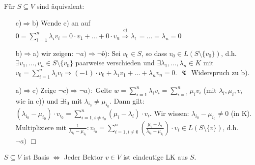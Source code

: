 \begin{lem}
	Für $S\subseteq V$ sind äquivalent:
\end{lem}

\begin{bew}
	\begin{itemize} %
		\item[c)$\Rightarrow$b)] Wende c) an auf $0=\sum\limits_{i=1}^n \lambda_i v_i =0\cdot v_1 +...+0\cdot v_n \stackrel{c)}{\Rightarrow} \lambda_1 =...= \lambda_n =0$
		\item[b)$\Rightarrow$a)] wir zeigen: $\neg a)\Rightarrow \neg b)$: Sei $v_0 \in S$, so dass $v_0 \in L(S\setminus\{v_0\})$, d.h. $\exists v_1,...,v_n \in S\setminus\{v_0\}$ paarweise verschieden und $\exists \lambda_1,...,\lambda_n \in K$ mit $v_0 =\sum\limits_{i=1}^n \lambda_i v_i \Rightarrow (-1)\cdot v_0 +\lambda_1 v_1 +...+ \lambda_n v_n =0$. $\lightning$ Widerspruch zu b).
		\item[a)$\Rightarrow$c)] Zeige $\neg c)\Rightarrow\neg a):$ Gelte $w=\sum\limits_{i=1}^n \lambda_i v_i = \sum\limits_{i=1}^n \mu_i v_i$ (mit $\lambda_i,\mu_i,v_i$ wie in c)) und $\exists i_0$ mit $\lambda_{i_0} \neq \mu_{i_0}$. Dann gilt: $(\lambda_{i_0} -\mu_{i_0})\cdot v_{i_0} =\sum\limits_{i=1,i\neq i_0}^n (\mu_i -\lambda_i)\cdot v_i$. Wir wissen: $\lambda_{i_0}-\mu_{i_0}\neq 0$ (in K). Multipliziere mit $\tfrac{1}{\lambda_{i_0}-\mu_{i_0}}:v_{i_0}=\sum\limits_{i=1,i\neq 0}^n (\tfrac{\mu_i -\lambda_i}{\lambda_{i_0} -\mu_{i_0}})\cdot v_i \in L(S\setminus\{v\})$, d.h. $\neg a)$ \hfill $\Box$
	\end{itemize}
\end{bew}

\begin{kor}
	$S\subseteq V$ ist Basis $\Leftrightarrow$ Jeder Bektor $v\in V$ ist eindeutige LK aus $S$.
\end{kor}

